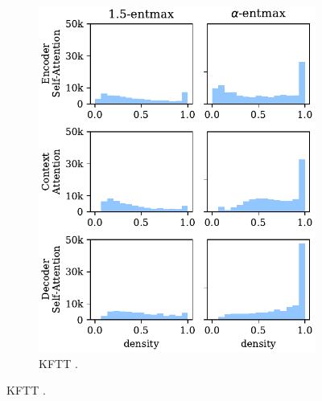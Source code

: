\begin{figure}[!htbp]
\begin{subfigure}[b]{.48\linewidth}
        \includegraphics[width=\linewidth]{Figures/hist_densities_ja.pdf}
        \caption{%
            \label{fig:hist_densities_ja}%
            KFTT .}
    \end{subfigure}


\end{figure}
